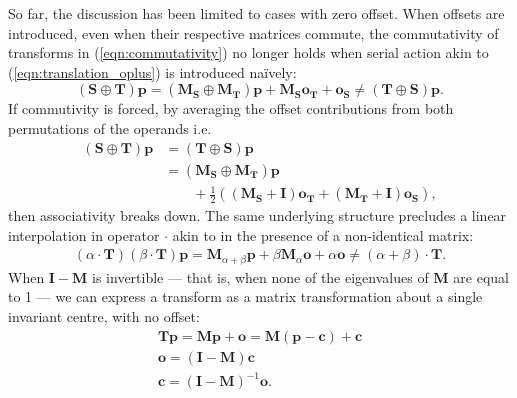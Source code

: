 		    So far, the discussion has been limited to cases with zero offset. When offsets are introduced, even when their respective matrices commute, the commutativity of transforms in (\ref{eqn:commutativity}) no longer holds when serial action akin to (\ref{eqn:translation_oplus}) is introduced na\"ively:
        \begin{equation}
          (\mathbf{S} \oplus \mathbf{T})\mathbf{p} = (\mathbf{M_S} \oplus \mathbf{M_T})\mathbf{p} + \mathbf{M_So_T} + \mathbf{o_S} \ne (\mathbf{T} \oplus \mathbf{S})\mathbf{p}.
        \end{equation}
        If commutivity is forced, by averaging the offset contributions from both permutations of the operands i.e.
        \begin{equation}
          \begin{split}
            (\mathbf{S} \oplus \mathbf{T})\mathbf{p} &= (\mathbf{T} \oplus \mathbf{S})\mathbf{p} \\
                                                     &= (\mathbf{M_S} \oplus \mathbf{M_T})\mathbf{p} \\
                                                     &\qquad + \frac{1}{2}\left(\left( \mathbf{M_S} + \mathbf{I} \right) \mathbf{o_T} + \left( \mathbf{M_T} + \mathbf{I} \right)\mathbf{o_S}\right),
          \end{split}
        \end{equation}
        then associativity breaks down. The same underlying structure precludes a linear interpolation in operator $\cdot$ akin to  in the presence of a non-identical matrix:
        \begin{gather}
          (\alpha \cdot \mathbf{T})(\beta \cdot \mathbf{T})\mathbf{p} = \mathbf{M}_{\alpha+\beta}\mathbf{p} + \beta\mathbf{M}_{\alpha}\mathbf{o} + \alpha\mathbf{o} \ne (\alpha + \beta) \cdot \mathbf{T}.
        \end{gather}
        When $\mathbf{I} - \mathbf{M}$ is invertible --- that is, when none of the eigenvalues of $\mathbf{M}$ are equal to 1 --- we can express a transform as a matrix transformation about a single invariant centre, with no offset:
        \begin{gather}
          \mathbf{Tp} = \mathbf{Mp} + \mathbf{o} = \mathbf{M}(\mathbf{p}-\mathbf{c}) + \mathbf{c} \\
          \mathbf{o} = (\mathbf{I} - \mathbf{M})\mathbf{c} \\
          \mathbf{c} = (\mathbf{I} - \mathbf{M})^{-1}\mathbf{o}.
        \end{gather}
